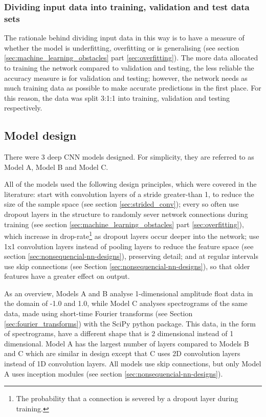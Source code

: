 \documentclass[12pt]{article}
\begin{document}
    \subsubsection{Dividing input data into training, validation and test data sets}
    The rationale behind dividing input data in this way is to have a measure of whether the model is underfitting, overfitting or is generalising (see section \ref{sec:machine_learning_obstacles} part \ref{sec:overfitting}). The more data allocated to training the network compared to validation and testing, the less reliable the accuracy measure is for validation and testing; however, the network needs as much training data as possible to make accurate predictions in the first place. For this reason, the data was split 3:1:1 into training, validation and testing respectively.\medskip
    
    \subsection{Model design}
    There were 3 deep CNN models designed. For simplicity, they are referred to as Model A, Model B and Model C.\medskip
    
    All of the models used the following design principles, which were covered in the literature: start with convolution layers of a stride greater-than 1, to reduce the size of the sample space (see section \ref{sec:strided_conv}); every so often use dropout layers in the structure to randomly sever network connections during training (see section \ref{sec:machine_learning_obstacles} part \ref{sec:overfitting}), which increase in drop-rate\footnote{The probability that a connection is severed by a dropout layer during training.} as dropout layers occur deeper into the network; use 1x1 convolution layers instead of pooling layers to reduce the feature space (see section \ref{sec:nonsequencial-nn-designs}), preserving detail; and at regular intervals use skip connections (see Section \ref{sec:nonsequencial-nn-designs}), so that older features have a greater effect on output.\medskip
    
    As an overview, Models A and B analyse 1-dimensional amplitude float data in the domain of -1.0 and 1.0, while Model C analyses spectrograms of the same data, made using short-time Fourier transforms (see Section \ref{sec:fourier_transforms}) with the SciPy python package. This data, in the form of spectrograms, have a different shape that is 2 dimensional instead of 1 dimensional. Model A has the largest number of layers compared to Models B and C which are similar in design except that C uses 2D convolution layers instead of 1D convolution layers. All models use skip connections, but only Model A uses inception modules (see section \ref{sec:nonsequencial-nn-designs}).\medskip
    
\end{document}
